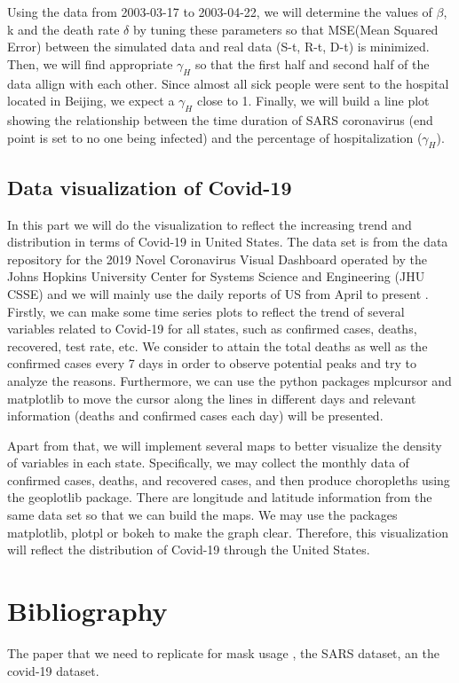 \documentclass{article}
\begin{document}
Using the data from 2003-03-17 to 2003-04-22, we will determine the values of $\beta$, k and the death rate $\delta$ by tuning these parameters so that MSE(Mean Squared Error) between the simulated data and real data (S-t, R-t, D-t) is minimized. Then, we will find appropriate $\gamma_{H}$ so that the first half and second half of the data allign with each other. Since almost all sick people were sent to the hospital located in Beijing, we expect a $\gamma_{H}$ close to 1.
Finally, we will build a line plot showing the relationship between the time duration of SARS coronavirus (end point is set to no one being infected) and the percentage of hospitalization ($\gamma_{H}$).





\subsection{Data visualization of Covid-19}

In this part we will do the visualization to reflect the increasing trend and distribution in terms of Covid-19 in United States. The data set is from the data repository for the 2019 Novel Coronavirus Visual Dashboard operated by the Johns Hopkins University Center for Systems Science and Engineering (JHU CSSE) and we will mainly use the daily reports of US from April to present \cite{Johnhopkins}.
Firstly, we can make some time series plots to reflect the trend of several variables related to Covid-19 for all states, such as confirmed cases, deaths, recovered, test rate, etc. We consider to attain the total deaths as well as the confirmed cases every 7 days in order to observe potential peaks and try to analyze the reasons. Furthermore, we can use the python packages mplcursor and matplotlib to move the cursor along the lines in different days and relevant information (deaths and confirmed cases each day) will be presented.

Apart from that, we will implement several maps to better visualize the density of variables in each state. Specifically, we may collect the monthly data of confirmed cases, deaths, and recovered cases, and then produce choropleths using the geoplotlib package. There are longitude and latitude information from the same data set so that we can build the maps. We may use the packages matplotlib, plotpl or bokeh to make the graph clear. Therefore, this visualization will reflect the distribution of Covid-19 through the United States.



\section{Bibliography}
The paper that we need to replicate for mask usage \cite{Steff2020mask}, the SARS dataset\cite{SARSsource}, an the covid-19 dataset\cite{Johnhopkins}.

\printbibliography
\end{document}
